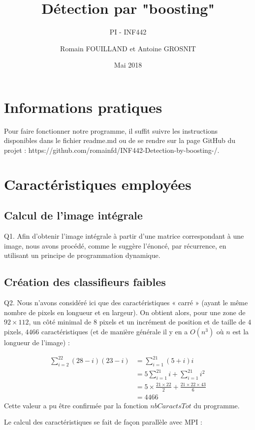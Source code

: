 \documentclass[a4paper,11pt]{article}
\title{Détection par "boosting"}
\author{Romain FOUILLAND et Antoine GROSNIT}
\subtitle{PI - INF442}
\date{Mai 2018}
\begin{document}
\maketitle
\section{Informations pratiques}
Pour faire fonctionner notre programme, il suffit suivre les instructions disponibles dans le fichier readme.md ou de se rendre sur la page GitHub du projet : https://github.com/romainfd/INF442-Detection-by-boosting-/.

\section{Caractéristiques employées}
\subsection{Calcul de l'image intégrale}

Q1. Afin d'obtenir l'image intégrale à partir d'une matrice correspondant à une image, nous avons procédé, comme le suggère l’énoncé, par récurrence, en utilisant un principe de programmation dynamique.

\subsection{Création des classifieurs faibles}

Q2. Nous n’avons considéré ici que des caractéristiques « carré » (ayant le même nombre de pixels en longueur et en largeur). On obtient alors, pour une zone de $92 \times 112$, un côté minimal de $8$ pixels et un incrément de position et de taille de $4$ pixels, $4466$ caractéristiques (et de manière générale il y en a $O(n^3)$ où $n$ est la longueur de l'image) :

\begin{align*}
	\sum_{i=2}^{22} (28-i)(23-i) &= \sum_{i=1}^{21} (5+i)i \\
	&= 5\sum_{i=1}^{21} i + \sum_{i=1}^{21} i^2\\
	&= 5\times\frac{21 \times 22}{2} + \frac{21 \times 22 \times 43}{6} \\
	&= 4466
\end{align*}
Cette valeur a pu être confirmée par la fonction $nbCaractsTot$ du programme.

Le calcul des caractéristiques se fait de façon parallèle avec MPI :\\
\end{document}
